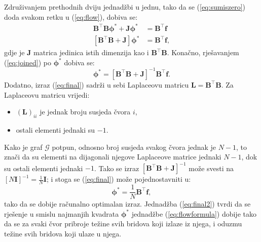 \documentclass[lmodern, utf8, diplomski, numeric]{fer}
\newcommand{\matr}[1]{\mathbold{#1}}
\newcommand{\graph}[1]{\mathcal{#1}}
\newcommand{\T}{\top}
\newcommand{\q}{\left}
\newcommand{\w}{\right}
\begin{document}
  Združivanjem prethodnih dviju jednadžbi u jednu, tako da se (\ref{eq:sumiszero}) doda svakom retku u (\ref{eq:flow}), dobiva se:
  \begin{align}
  \matr{B}^\T \matr{B} \matr{\phi^*} + \matr{J} \matr{\phi^*} &= \matr{B}^\T \matr{f} \nonumber \\
  \label{eq:joined}
  \q[\matr{B}^\T \matr{B} + \matr{J} \w] \matr{\phi^*} &= \matr{B}^\T \matr{f},
  \end{align}
  gdje je $\matr{J}$ matrica jedinica istih dimenzija kao i $\matr{B}^\T \matr{B}$.
  Konačno, rješavanjem (\ref{eq:joined}) po $\matr{\phi^*}$ dobiva se:
  \begin{equation}
  \label{eq:final}
  \matr{\phi^*} = \q[\matr{B}^\T \matr{B} + \matr{J} \w]^{-1} \matr{B}^\T \matr{f}.
  \end{equation}
  Dodatno, izraz (\ref{eq:final}) sadrži u sebi Laplaceovu matricu $\matr{L} = \matr{B}^\T\matr{B}$.
  Za Laplaceovu matricu vrijedi:
  \begin{itemize}
    \item $(\matr{L})_{ii}$ je jednak broju susjeda čvora $i$,
    \item ostali elementi jednaki su $-1$.
  \end{itemize}
  Kako je graf $\graph{G}$ potpun, odnosno broj susjeda svakog čvora jednak je $N - 1$, to znači da su elementi na dijagonali njegove Laplaceove matrice jednaki $N - 1$, dok su ostali elementi jednaki $-1$.
  Tako se izraz $\q[ \matr{B}^\T \matr{B} + \matr{J} \w]^{-1}$ može svesti na $\q[ N \matr{I} \w]^{-1} = \frac{1}{N} \matr{I}$; i stoga se (\ref{eq:final}) može pojednostavniti u:
  \begin{equation}
  \label{eq:final2}
  \matr{\phi^*} = \frac{1}{N} \matr{B}^\T \matr{f},
  \end{equation}
  tako da se dobije računalno optimalan izraz.
  Jednadžba (\ref{eq:final2}) tvrdi da se rješenje u smislu najmanjih kvadrata $\matr{\phi^*}$ jednadžbe (\ref{eq:flowformula}) dobije tako da se za svaki čvor pribroje težine svih bridova koji izlaze iz njega, i oduzmu težine svih bridova koji ulaze u njega.
  
\end{document}
